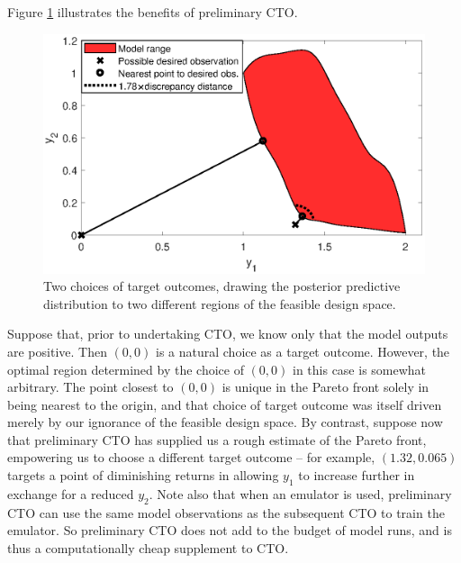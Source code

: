 \documentclass[12pt]{article}
\begin{document}
Figure \ref{fig:do_selection_example} illustrates the benefits of preliminary CTO.
%
\begin{figure}
\centering
\includegraphics[scale=.8]{FIG_des_obs_selection_example}
\caption{Two choices of target outcomes, drawing the posterior predictive distribution to two different regions of the feasible design space.}
\label{fig:do_selection_example}
\end{figure}
%
Suppose that, prior to undertaking CTO, we know only that the model outputs are positive.
%
Then $(0,0)$ is a natural choice as a target outcome.
%
However, the optimal region determined by the choice of $(0,0)$ in this case is somewhat arbitrary.
%
%
The point closest to $(0,0)$ is unique in the Pareto front solely in being nearest to the origin, and that choice of target outcome was itself driven merely by our ignorance of the feasible design space.
%
%
By contrast, suppose now that preliminary CTO has supplied us a rough estimate of the Pareto front, empowering us to choose a different target outcome -- for example, $(1.32,0.065)$ targets a point of diminishing returns in allowing $y_1$ to increase further in exchange for a reduced $y_2$.
%
%
%
%
Note also that when an emulator is used, preliminary CTO can use the same model observations as the subsequent CTO to train the emulator.
%
So preliminary CTO does not add to the budget of model runs, and is thus a computationally cheap supplement to CTO.
%
\end{document}
